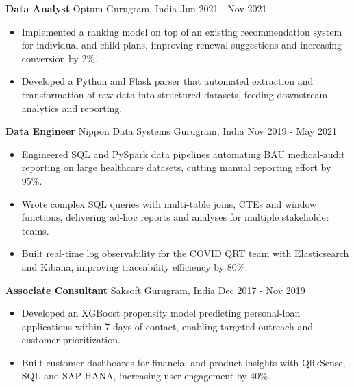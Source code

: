 \documentclass[10pt,a4paper]{article}
\newcommand{\role}[4]{\textbf{#1} \textbar{} #2 \hfill #3 \textbar{} #4\par}
\begin{document}
\vspace{3pt}
\role{Data Analyst}{Optum}{Gurugram, India}{Jun 2021 - Nov 2021}
\begin{itemize}
  \item Implemented a ranking model on top of an existing recommendation system for individual and child plans, improving renewal suggestions and increasing conversion by 2\%.
  \item Developed a Python and Flask parser that automated extraction and transformation of raw data into structured datasets, feeding downstream analytics and reporting.
\end{itemize}
\vspace{3pt}
\role{Data Engineer}{Nippon Data Systems}{Gurugram, India}{Nov 2019 - May 2021}
\begin{itemize}
  \item Engineered SQL and PySpark data pipelines automating BAU medical-audit reporting on large healthcare datasets, cutting manual reporting effort by 95\%.
  \item Wrote complex SQL queries with multi-table joins, CTEs and window functions, delivering ad-hoc reports and analyses for multiple stakeholder teams.
  \item Built real-time log observability for the COVID QRT team with Elasticsearch and Kibana, improving traceability efficiency by 80\%.
\end{itemize}
\vspace{3pt}
\role{Associate Consultant}{Saksoft}{Gurugram, India}{Dec 2017 - Nov 2019}
\begin{itemize}
  \item Developed an XGBoost propensity model predicting personal-loan applications within 7 days of contact, enabling targeted outreach and customer prioritization.
  \item Built customer dashboards for financial and product insights with QlikSense, SQL and SAP HANA, increasing user engagement by 40\%.
\end{itemize}
\end{document}
